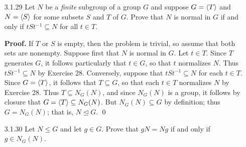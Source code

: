 \begin{enumerate}
      \textbf{Proof.} Suppose $S$ is nonempty (otherwise, the problem would be
      trivial). Suppose some element $g \in G$ normalizes $N$. Then
      $gNg^{-1} = N$; particularly, $gNg^{-1} \subseteq N$. Since
      $S \subseteq N$, it follows that $gSg^{-1} \subseteq N$. Now suppose that
      $gSg^{-1} \subseteq N$ for some $g \in G$. Let $n \in N$. Then
      $n = {s_1}^{\epsilon_1}{s_2}^{\epsilon_2} \cdots{s_m}^{\epsilon_m}$, where 
      $m \in \Z^+$, and for each $1 \le i \le m$,
      $\epsilon_i \in \Z$ and $s_i \in S$. Now
      \begin{align*}
         gng^{-1} &= g({s_1}^{\epsilon_1}{s_2}^{\epsilon_2} \cdots
            {s_m}^{\epsilon_m})g^{-1} \\
            &= (g{s_1}^{\epsilon_1}g^{-1})\cdot (g{s_2}^{\epsilon_2}g^{-1})
               \cdots(g{s_m}^{\epsilon_m}g^{-1}). &[\text{Exercise 26(a)}]
      \end{align*}
      By assumption $g{s_i}g^{-1} \in N$, and by closure of $N$ and Lemma
      \ref{1_1_22_1}, it follows that
      $(g{s_i}g^{-1})^{\epsilon_i} = g{s_i}^{\epsilon_i}g^{-1} \in N$,
      for each $1 \le i \le m$, so that $gng^{-1} \in N$ by closure of $N$.
      That is, $gNg^{-1} \subseteq N$. Conclude by Exercise 27 that $g$ 
      normalizes $N$. \qed
   \item[3.1.29]  Let $N$ be a \textit{finite} subgroup of a group $G$ and
                  suppose $G = \langle T \rangle$ and $N = \langle S \rangle$ for some subsets $S$
                  and $T$ of $G$. Prove that $N$ is normal in $G$ if and only if
                  $tSt^{-1} \subseteq N$ for all $t \in T$.

      \textbf{Proof.} If $T$ or $S$ is empty, then the problem is trivial, so
      assume that both sets are nonempty. Suppose first that $N$ is normal in
      $G$. Let $t \in T$. Since $T$ generates $G$, it follows particularly that
      $t \in G$, so that $t$ normalizes $N$. Thus $tSt^{-1} \subseteq N$ by
      Exercise 28. Conversely, suppose that $tSt^{-1} \subseteq N$ for each
      $t \in T$. Since $G = \langle T \rangle$, it follows that $T \subseteq G$, so that
      each $t\in T$ normalizes $N$ by Exercise 28. Thus $T \subseteq N_G(N)$, 
      and since $N_G(N)$ is a group, it follows by closure that
      $G = \langle T \rangle \subseteq N_G(N)$. But $N_G(N) \subseteq G$ by definition;
      thus $G = N_G(N)$; that is, $N \trianglelefteq G$. \qed
   \item[3.1.30]  Let $N \le G$ and let $g \in G$. Prove that $gN = Ng$ if and
                  only if $g \in N_G(N)$.


\end{enumerate}
